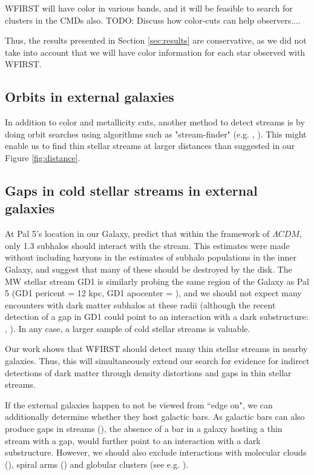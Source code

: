 \documentclass[twocolumn]{aastex62}
\newcommand{\todo}[1]{{\color{red} TODO: #1}}
\begin{document}
WFIRST will have color in various bands, and it will be feasible to search for clusters in the CMDs also. \todo{Discuss how color-cuts can help observers...}.

Thus, the results presented in Section \ref{sec:results} are conservative, as we did not take into account that we will have color information for each star observed with WFIRST. 


\subsection{Orbits in external galaxies}
In addition to color and metallicity cuts, another method to detect streams is by doing orbit searches using algorithms such as "stream-finder" (e.g. \citealt{malhan18}, \citealt{ibata19}). This might enable us to find thin stellar streams at larger distances than suggested in our Figure \ref{fig:distance}. 




\subsection{Gaps in cold stellar streams in external galaxies}
 At Pal 5's location in our Galaxy, \citet{bovy17} predict that within the framework of $\Lambda CDM$, only 1.3 subhalos should interact with the stream. This estimates were made without including baryons in the estimates of subhalo populations in the inner Galaxy, and \citet{garrison17} suggest that many of these should be destroyed by the disk. The MW stellar stream GD1 is similarly probing the same region of the Galaxy as Pal 5 (GD1 pericent = 12 kpc, GD1 apocenter = ), and we should not expect many encounters with dark matter subhalos at these radii (although the recent detection of a gap in GD1 could point to an interaction with a dark substructure: \citealt{price18}, \citet{bonaca19}).  In any case,  a larger sample of cold stellar streams is valuable.  
 
Our work shows that WFIRST should detect many thin stellar streams in nearby galaxies. Thus, this will simultaneously extend our search for evidence for indirect detections of dark matter through density distortions and gaps in thin stellar streams. 

If the external galaxies happen to not be viewed from ``edge on", we can additionally determine whether they host galactic bars. As galactic bars can also produce gaps in streams  (\citealt{pearson17}), the absence of a bar in a galaxy hosting a thin stream with a gap, would further point to an interaction with a dark substructure. However, we should also exclude interactions with molecular clouds (\citealt{amorisco16}), spiral arms (\citealt{banik19}) and globular clusters (see e.g. \citealt{bonaca19}).
\end{document}

